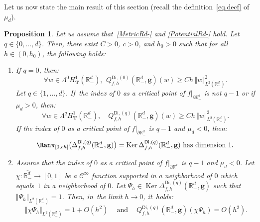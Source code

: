 \documentclass[10pt]{amsart}
\newenvironment{enumeratei}
{\bgroup\def\theenumi{\roman{enumi}}\def\theenumii{\arabic{enumii}}\begin{enumerate}}
{\end{enumerate}\egroup}
\newcommand{\quand}{\quad\text{and}\quad}
\newcommand{\mbf}[1]{\mathbf{#1}}
\let\pa\partial
\DeclareMathOperator\Ker{Ker}
\theoremstyle{plain}
\newtheorem{proposition}{Proposition}
\theoremstyle{definition}
\begin{document}
Let us now state the main result of this section (recall the
definition~\eqref{eq.decf} of $\mu_d$).

\begin{proposition}\label{pr.prop-loca1-case1}
Let us assume that~\ref{MetricRd-} and \ref{PotentialRd-}
hold. Let $q\in \{0,\ldots,d\}$. Then, there exist $C>0$, $c>0$,
and $h_0>0$ such that for all $h\in (0,h_0)$, the following holds:
\begin{enumeratei}
\item\label{pr.prop-loca1-case1i}
If $q=0$, then:
\begin{equation}\label{eq.last1-case1}
\forall w\in \Lambda^0 H^1_{\mbf T}(\mathbb R^d_-), \ \, Q_{f,h}^{\mathsf{Di},(0)}(\mathbb R^d_-,\mbf g)(w)\ge Ch\, \Vert w \Vert_{L^2(\mathbb R^d_-)}^2.
\end{equation}
Let $q\in \{1,\ldots,d\}$. If~the index of $0$ as a critical point of
$f|_{\pa \mathbb R^d_-}$ is not $q-1$ or if $\mu_{d}>0$, then:
\begin{equation}\label{eq.last2-case1}
\forall w\in \Lambda^q H^1_{\mbf T}(\mathbb R^d_-), \quad Q_{f,h}^{\mathsf{Di},(q)}(\mathbb R^d_-,\mbf g)(w)\ge Ch\, \Vert w \Vert_{L^2(\mathbb R^d_-)}^2.
\end{equation}
If the index of $0$ as a critical point of $f|_{\pa \mathbb R^d_-}$
is $q-1$ and $\mu_{d}<0$, then:
\begin{equation}\label{eq.last3-case1}
\Ran \pi_{[0,ch]}\bigl(\Delta_{f,h}^{\mathsf{Di},(q)}(\mathbb R_-^d,\mbf g)\bigr)=\Ker \Delta_{f,h}^{\mathsf{Di},(q)}(\mathbb R_-^d,\mbf g) \text{ has dimension } 1.
\end{equation}
\item\label{pr.prop-loca1-case1ii}
Assume that the index of $0$ as a critical point of $f|_{\pa \mathbb R^d_-}$
is $q-1$ and $\mu_{d}<0$. Let $\chi: \overline{\mathbb R^{d}_-}\to [0,1]$ be a $\mathcal C^\infty$ function supported in a neighborhood of $0$ which equals~$1$ in a neighborhood of $0$.
Let $\Psi_h\in \Ker \Delta_{f,h}^{\mathsf{Di},(q)}(\mathbb R_-^d,\mbf g)$ such that $ \Vert \Psi_h \Vert_{L^2(\mathbb R^d_-)}=1$. Then,
in~the limit $h\to 0$, it~holds:
\begin{equation}\label{eq.norme-case1}
\ \Vert \chi \Psi_h \Vert_{L^2(\mathbb R^d_-)} =1+O (h^{2}) \ \quand \ Q_{f,h}^{\mathsf{Di},(q)}(\mathbb R^d_-,\mbf g)(\chi \Psi_h)=O(h^{2}).
\end{equation}
\end{enumeratei}
\end{proposition}
\end{document}
